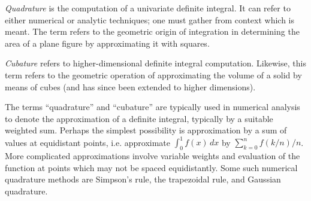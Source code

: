 \documentclass{article}
\begin{document}
\emph{Quadrature} is the computation of a univariate definite integral.  It can refer to either numerical or analytic techniques; one must gather from context which is meant.  The term refers to the geometric origin of integration in determining the area of a plane figure by approximating it with squares.

\emph{Cubature} refers to higher-dimensional definite integral computation.  Likewise, this term refers to the geometric operation of approximating the volume of a solid by means of cubes (and has since been extended to higher dimensions).

The terms ``quadrature'' and ``cubature'' are typically used in numerical analysis
to denote the approximation of a definite integral, typically by a suitable
weighted sum.  Perhaps the simplest possibility is approximation by a sum of
values at equidistant points, i.e. approximate $\int_0^1 f(x) \, dx$ by
$\sum_{k=0}^n f(k/n) / n$.  More complicated approximations involve variable
weights and evaluation of the function at points which may not be spaced
equidistantly. Some such numerical quadrature methods are Simpson's rule, the trapezoidal rule, and Gaussian quadrature.
\end{document}
